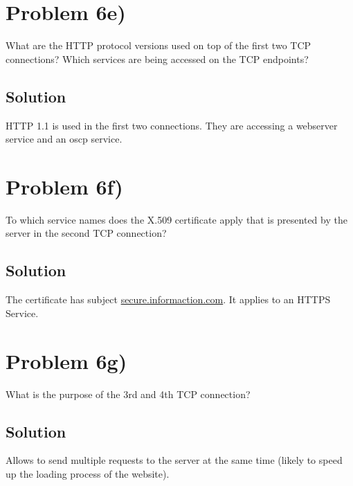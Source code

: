 \documentclass[a4paper,10pt]{article}
\begin{document}
\section{Problem 6e)}

What are the HTTP protocol versions used on top of the first two TCP connections? Which
services are being accessed on the TCP endpoints?

\subsection{Solution}
HTTP 1.1 is used in the first two connections. They are accessing a webserver service and an oscp service.

\section{Problem 6f)}

To which service names does the X.509 certificate apply that is presented by the server in the second TCP connection?

\subsection{Solution}

The certificate has subject \url{secure.informaction.com}. It applies to an HTTPS Service.

\section{Problem 6g)}

What is the purpose of the 3rd and 4th TCP connection?

\subsection{Solution}
Allows to send multiple requests to the server at the same time (likely to speed up the loading process of the website).
\end{document}
